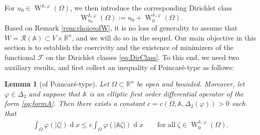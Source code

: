 \documentclass[a4paper,11pt]{amsart}
\numberwithin{equation}{section}
\newcommand{\R}{\mathbb{R}}
\newcommand{\dif}{\operatorname{d}\!}
\newcommand{\sobo}{\operatorname{W}}
\newtheorem{lemma}[defi]{Lemma}
\begin{document}
	
	For $u_{0}\in\sobo^{\mathbb{A},\varphi}(\Omega)$, we then introduce the corresponding Dirichlet class 
	\begin{equation}\label{eq:DirClass}
		\sobo_{u_{0}}^{\mathbb{A},\varphi}(\Omega):=u_{0}+\sobo_{0}^{\mathbb{A},\varphi}(\Omega). 
	\end{equation}
	Based on Remark \ref{rem:choiceofW}, it is no loss of generality to assume that $W=\mathscr{R}(\mathbb{A})\subset V\times\R^{n}$, and we will do so in the sequel. Our main objective in this section is to establish the coercivity and the existence of minimizers of the functional $\mathcal{F}$ on the Dirichlet classes \eqref{eq:DirClass}. To this end, we need two auxiliary results, and first collect an inequality of Poincar\'{e}-type as follows: 
	\begin{lemma}[of Poincar\'{e}-type]\label{lem:poincareinequality}
		Let $\Omega\subset\R^{n}$ be open and bounded. Moreover, let $\varphi\in\Delta_{2}$ and suppose that $\mathbb{A}$ is an elliptic first order differential operator of the form \eqref{eq:formA}. Then there exists a constant $c=c(\Omega,\mathbb{A},\Delta_{2}(\varphi))>0$ such that 
		\begin{align}\label{eq:PoincareMain}
			\int_{\Omega}\varphi(|\zeta|)\dif x \leq c\int_{\Omega}\varphi(|\mathbb{A}\zeta|)\dif x \qquad\text{for all}\;\zeta\in\sobo_{0}^{\mathbb{A},\varphi}(\Omega). 
		\end{align}
	\end{lemma}
\end{document}
